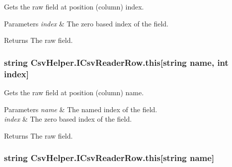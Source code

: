 Gets the raw field at position (column) index. 


\begin{DoxyParams}{Parameters}
{\em index} & The zero based index of the field.\\
\hline
\end{DoxyParams}
\begin{DoxyReturn}{Returns}
The raw field.
\end{DoxyReturn}
\hypertarget{a00089_abe611a2c471e6f11da579297bb876fb1}{
\subsubsection[{this[string name, int index]}]{\setlength{\rightskip}{0pt plus 5cm}string Csv\-Helper.\-I\-Csv\-Reader\-Row.\-this\mbox{[}string name, int index\mbox{]}\hspace{0.3cm}{\ttfamily [get]}}}\label{a00089_abe611a2c471e6f11da579297bb876fb1}


Gets the raw field at position (column) name. 


\begin{DoxyParams}{Parameters}
{\em name} & The named index of the field.\\
\hline
{\em index} & The zero based index of the field.\\
\hline
\end{DoxyParams}
\begin{DoxyReturn}{Returns}
The raw field.
\end{DoxyReturn}
\hypertarget{a00089_a999cf88bd8eb0b59c65b235cfe0e2835}{
\subsubsection[{this[string name]}]{\setlength{\rightskip}{0pt plus 5cm}string Csv\-Helper.\-I\-Csv\-Reader\-Row.\-this\mbox{[}string name\mbox{]}\hspace{0.3cm}{\ttfamily [get]}}}\label{a00089_a999cf88bd8eb0b59c65b235cfe0e2835}


